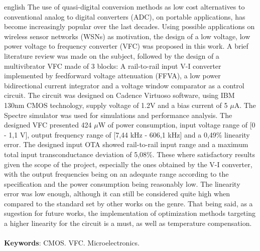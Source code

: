 \documentclass[
	12pt,				%
	oneside,			%
	a4paper,			%
	english,			%
	french,				%
	spanish,			%
	brazil				%
	]{abntex2}
\begin{document}
\begin{resumo}[Abstract]
 \begin{otherlanguage*}{english}
The use of quasi-digital conversion methods as low cost alternatives to conventional analog to digital converters (ADC), on portable applications, has become increasingly popular over the last decades. Using possible applications on wireless sensor networks (WSNs) as motivation, the design of a  low voltage, low power voltage to frequency converter (VFC) was proposed in this work. A brief literature review was made on the subject, followed by the design of a multivibrator VFC made of 3 blocks: A rail-to-rail input V-I converter implemented by feedforward voltage attenuation (FFVA), a low power bidirectional current integrator and a voltage window comparator as a control circuit. The circuit was designed on Cadence Virtuoso software, using IBM 130nm CMOS technology, supply voltage of 1.2V and a bias current of 5 $\mu$A. The Spectre simulator was used for simulations and performance analysis. The designed VFC presented 424 $\mu$W of power consumption, input voltage range of [0 - 1,1 V], output frequency range of [7,44 kHz - 606,1 kHz] and a 0,49\% linearity error. The designed input OTA showed rail-to-rail input range and a maximum total input transconductance deviation of 5,08\%. These where satisfactory results given the scope of the project, especially the ones obtained by the V-I converter, with the output frequencies being on an adequate range according to the specification and the power consumption being reasonably low. The linearity error was low enough, although it can still be considered quite high when compared to the standard set by other works on the genre. That being said, as a sugestion for future works, the implementation of optimization methods targeting a higher linearity for the circuit is a must, as well as temperature compensation.    
\\
\\
   \textbf{Keywords}: CMOS. VFC. Microelectronics.
 \end{otherlanguage*}
\end{resumo}

\listoffigures*
\clearpage

\listoftables*
\clearpage
\end{document}
